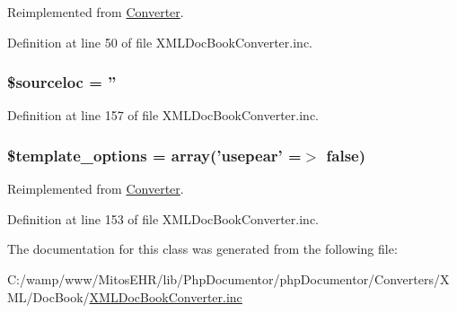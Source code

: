 \-Reimplemented from \hyperlink{class_converter_ab5dae87e1968b35e37687a763216a835}{\-Converter}.



\-Definition at line 50 of file \-X\-M\-L\-Doc\-Book\-Converter.\-inc.

\hypertarget{class_x_m_l_doc_book_converter_a9658cd0f27d80c5ba9b9c7d3b9ba4609}{
\subsubsection[{\$sourceloc}]{\setlength{\rightskip}{0pt plus 5cm}\$sourceloc = ''}}\label{class_x_m_l_doc_book_converter_a9658cd0f27d80c5ba9b9c7d3b9ba4609}


\-Definition at line 157 of file \-X\-M\-L\-Doc\-Book\-Converter.\-inc.

\hypertarget{class_x_m_l_doc_book_converter_a9e8e3182b20bb595bfe9186d97b57bb2}{
\subsubsection[{\$template\-\_\-options}]{\setlength{\rightskip}{0pt plus 5cm}\$template\-\_\-options = array('usepear' =$>$ false)}}\label{class_x_m_l_doc_book_converter_a9e8e3182b20bb595bfe9186d97b57bb2}


\-Reimplemented from \hyperlink{class_converter_a9e8e3182b20bb595bfe9186d97b57bb2}{\-Converter}.



\-Definition at line 153 of file \-X\-M\-L\-Doc\-Book\-Converter.\-inc.



\-The documentation for this class was generated from the following file\-:\begin{DoxyCompactItemize}
\item 
\-C\-:/wamp/www/\-Mitos\-E\-H\-R/lib/\-Php\-Documentor/php\-Documentor/\-Converters/\-X\-M\-L/\-Doc\-Book/\hyperlink{_x_m_l_doc_book_converter_8inc}{\-X\-M\-L\-Doc\-Book\-Converter.\-inc}\end{DoxyCompactItemize}

